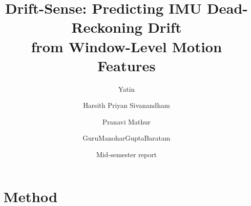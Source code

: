 \documentclass[11pt,a4paper]{article}
\title{Drift-Sense: Predicting IMU Dead-Reckoning Drift\\from Window-Level Motion Features}
\author{Yatin \and Harsith Priyan Sivanandham \and Pranavi Mathur \and GuruManoharGuptaBaratam}
\date{Mid-semester report}
\begin{document}
\maketitle



\section{Method}
\label{sec:method}








\end{document}
